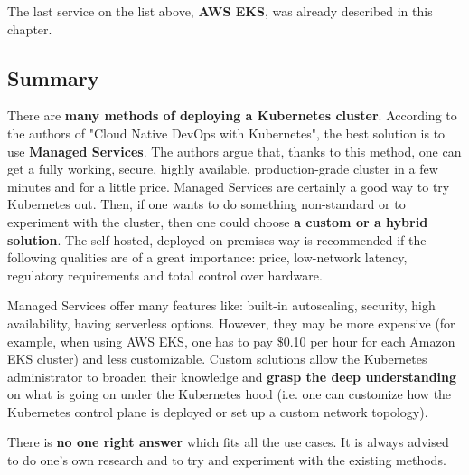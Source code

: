 The last service on the list above, \textbf{AWS EKS}, was already described in this chapter.

\subsection{Summary}

There are \textbf{many methods of deploying a Kubernetes cluster}. According to the authors of "Cloud Native DevOps with Kubernetes"\cite{book-cndwk}, the best solution is to use \textbf{Managed Services}. The authors argue that, thanks to this method, one can get a fully working, secure, highly available, production-grade cluster in a few minutes and for a little price. Managed Services are certainly a good way to try Kubernetes out. Then, if one wants to do something non-standard or to experiment with the cluster, then one could choose \textbf{a custom or a hybrid solution}. The self-hosted, deployed on-premises way is recommended if the following qualities are of a great importance: price, low-network latency, regulatory requirements and total control over hardware\cite{book-mastering-k8s}.

Managed Services offer many features like: built-in autoscaling, security, high availability, having serverless options. However, they may be more expensive (for example, when using AWS EKS, one has to pay \$0.10 per hour for each Amazon EKS cluster\cite{online-eks-pricing}) and less customizable. Custom solutions allow the Kubernetes administrator to broaden their knowledge and \textbf{grasp the deep understanding} on what is going on under the Kubernetes hood (i.e. one can customize how the Kubernetes control plane is deployed or set up a custom network topology).

There is \textbf{no one right answer} which fits all the use cases. It is always advised to do one's own research and to try and experiment with the existing methods.
